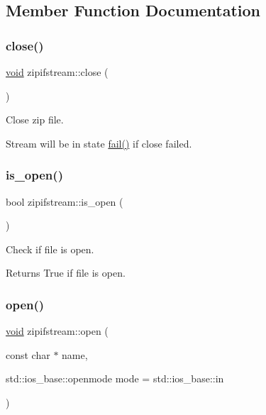 \subsection{Member Function Documentation}
\mbox{\label{classzipifstream_a15318cb53e9e01e6d3503d019b683113}} 
\subsubsection{\texorpdfstring{close()}{close()}}
{\footnotesize\ttfamily \hyperlink{lp__lib_8h_ac7828c7b2b31d2e11af17bdb6289c5d9}{void} zipifstream\+::close (\begin{DoxyParamCaption}{ }\end{DoxyParamCaption})}



Close zip file. 

Stream will be in state \hyperlink{_constraint_macros_8h_a73a3b169ac8c3419cbe15327e75ffcfd}{fail()} if close failed. \mbox{\label{classzipifstream_a79ad0d677fdffee47f9b1905e538a13f}} 
\subsubsection{\texorpdfstring{is\+\_\+open()}{is\_open()}}
{\footnotesize\ttfamily bool zipifstream\+::is\+\_\+open (\begin{DoxyParamCaption}{ }\end{DoxyParamCaption})\hspace{0.3cm}{\ttfamily [inline]}}



Check if file is open. 

\begin{DoxyReturn}{Returns}
True if file is open. 
\end{DoxyReturn}
\mbox{\label{classzipifstream_acc6d1ce5b46679742cbaaa517a2ff1f5}} 
\subsubsection{\texorpdfstring{open()}{open()}}
{\footnotesize\ttfamily \hyperlink{lp__lib_8h_ac7828c7b2b31d2e11af17bdb6289c5d9}{void} zipifstream\+::open (\begin{DoxyParamCaption}\item[{const char $\ast$}]{name,  }\item[{std\+::ios\+\_\+base\+::openmode}]{mode = {\ttfamily std\+:\+:ios\+\_\+base\+:\+:in} }\end{DoxyParamCaption})}



